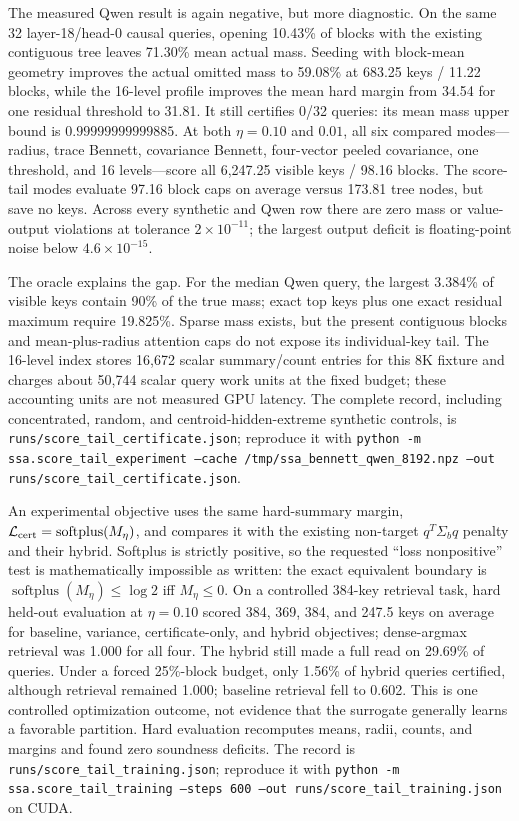 \documentclass[11pt]{article}
\numberwithin{equation}{section}
\begin{document}
The measured Qwen result is again negative, but more diagnostic. On the same 32 layer-18/head-0 causal
queries, opening 10.43\% of blocks with the existing contiguous tree leaves 71.30\% mean actual mass. Seeding
with block-mean geometry improves the actual omitted mass to 59.08\% at 683.25 keys / 11.22 blocks, while the
16-level profile improves the mean hard margin from 34.54 for one residual threshold to 31.81. It still
certifies 0/32 queries: its mean mass upper bound is $0.99999999999885$. At both $\eta=0.10$ and $0.01$, all
six compared modes---radius, trace Bennett, covariance Bennett, four-vector peeled covariance, one threshold,
and 16 levels---score all 6,247.25 visible keys / 98.16 blocks. The score-tail modes evaluate 97.16 block caps
on average versus 173.81 tree nodes, but save no keys. Across every synthetic and Qwen row there are zero
mass or value-output violations at tolerance $2\times10^{-11}$; the largest output deficit is floating-point
noise below $4.6\times10^{-15}$.

The oracle explains the gap. For the median Qwen query, the largest 3.384\% of visible keys contain 90\% of
the true mass; exact top keys plus one exact residual maximum require 19.825\%. Sparse mass exists, but the
present contiguous blocks and mean-plus-radius attention caps do not expose its individual-key tail. The
16-level index stores 16,672 scalar summary/count entries for this 8K fixture and charges about 50,744 scalar
query work units at the fixed budget; these accounting units are not measured GPU latency. The complete
record, including concentrated, random, and centroid-hidden-extreme synthetic controls, is
\texttt{runs/score\_tail\_certificate.json}; reproduce it with
\texttt{python -m ssa.score\_tail\_experiment --cache /tmp/ssa\_bennett\_qwen\_8192.npz --out
runs/score\_tail\_certificate.json}.

An experimental objective uses the same hard-summary margin,
$\mathcal L_{\rm cert}=\operatorname{softplus}(M_\eta)$, and compares it with the existing non-target
$q^T\Sigma_bq$ penalty and their hybrid. Softplus is strictly positive, so the requested ``loss nonpositive''
test is mathematically impossible as written: the exact equivalent boundary is
$\operatorname{softplus}(M_\eta)\le\log2$ iff $M_\eta\le0$. On a controlled 384-key retrieval task, hard
held-out evaluation at $\eta=0.10$ scored 384, 369, 384, and 247.5 keys on average for baseline, variance,
certificate-only, and hybrid objectives; dense-argmax retrieval was 1.000 for all four. The hybrid still made
a full read on 29.69\% of queries. Under a forced 25\%-block budget, only 1.56\% of hybrid queries certified,
although retrieval remained 1.000; baseline retrieval fell to 0.602. This is one controlled optimization
outcome, not evidence that the surrogate generally learns a favorable partition. Hard evaluation recomputes
means, radii, counts, and margins and found zero soundness deficits. The record is
\texttt{runs/score\_tail\_training.json}; reproduce it with
\texttt{python -m ssa.score\_tail\_training --steps 600 --out runs/score\_tail\_training.json} on CUDA.
\end{document}

